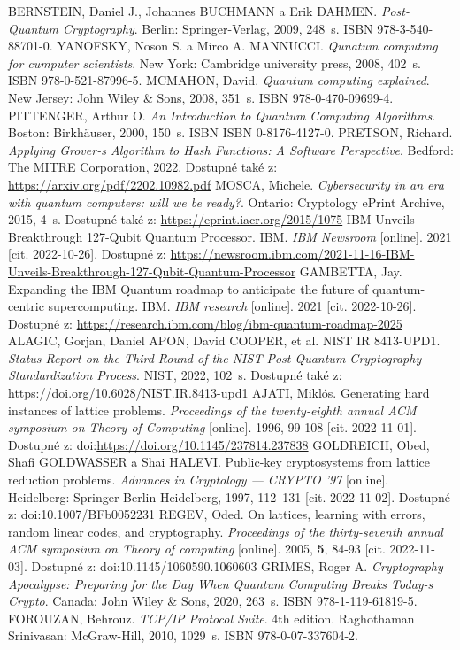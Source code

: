 \begin{thebibliography}{99}
  BERNSTEIN, Daniel J., Johannes BUCHMANN a Erik DAHMEN. \textit{Post-Quantum Cryptography}. Berlin: Springer-Verlag, 2009, 248~s. ISBN 978-3-540-88701-0.
  YANOFSKY, Noson S. a Mirco A. MANNUCCI. \textit{Qunatum computing for cumputer scientists}. New York: Cambridge university press, 2008, 402~s. ISBN 978-0-521-87996-5.
  MCMAHON, David. \textit{Quantum computing explained}. New Jersey: John Wiley \& Sons, 2008, 351~s. ISBN 978-0-470-09699-4. 
  PITTENGER, Arthur O. \textit{An Introduction to Quantum Computing Algorithms}. Boston: Birkhäuser, 2000, 150~s. ISBN ISBN 0-8176-4127-0.
  PRETSON, Richard. \textit{Applying Grover-s Algorithm to Hash Functions: A Software Perspective}. Bedford: The MITRE Corporation, 2022. Dostupné také z: \url{https://arxiv.org/pdf/2202.10982.pdf}
  MOSCA, Michele. \textit{Cybersecurity in an era with quantum computers: will we be ready?}. Ontario: Cryptology ePrint Archive, 2015, 4~s. Dostupné také z: \url{https://eprint.iacr.org/2015/1075}
  IBM Unveils Breakthrough 127-Qubit Quantum Processor. IBM. \textit{IBM Newsroom} [online]. 2021 [cit. 2022-10-26]. Dostupné z: \url{https://newsroom.ibm.com/2021-11-16-IBM-Unveils-Breakthrough-127-Qubit-Quantum-Processor}
  GAMBETTA, Jay. Expanding the IBM Quantum roadmap to anticipate the future of quantum-centric supercomputing. IBM. \textit{IBM research} [online]. 2021 [cit. 2022-10-26]. Dostupné z: \url{https://research.ibm.com/blog/ibm-quantum-roadmap-2025}
  ALAGIC, Gorjan, Daniel APON, David COOPER, et al. NIST IR 8413-UPD1. \textit{Status Report on the Third Round of the NIST Post-Quantum Cryptography Standardization Process}. NIST, 2022, 102~s. Dostupné také z: \url{https://doi.org/10.6028/NIST.IR.8413-upd1}
  AJATI, Miklós. Generating hard instances of lattice problems. \textit{Proceedings of the twenty-eighth annual ACM symposium on Theory of Computing} [online]. 1996, 99-108 [cit. 2022-11-01]. Dostupné z: doi:\url{https://doi.org/10.1145/237814.237838}
  GOLDREICH, Obed, Shafi GOLDWASSER a Shai HALEVI. Public-key cryptosystems from lattice reduction problems. \textit{Advances in Cryptology --- CRYPTO '97} [online]. Heidelberg: Springer Berlin Heidelberg, 1997, 112--131 [cit. 2022-11-02]. Dostupné z: doi:10.1007/BFb0052231
  REGEV, Oded. On lattices, learning with errors, random linear codes, and cryptography. \textit{Proceedings of the thirty-seventh annual ACM symposium on Theory of computing} [online]. 2005, \textbf{5}, 84-93 [cit. 2022-11-03]. Dostupné z: doi:10.1145/1060590.1060603
  GRIMES, Roger A. \textit{Cryptography Apocalypse: Preparing for the Day When Quantum Computing Breaks Today-s Crypto}. Canada: John Wiley \& Sons, 2020, 263~s. ISBN 978-1-119-61819-5.
  FOROUZAN, Behrouz. \textit{TCP/IP Protocol Suite}. 4th edition. Raghothaman Srinivasan: McGraw-Hill, 2010, 1029~s. ISBN 978-0-07-337604-2.
  
\end{thebibliography}

